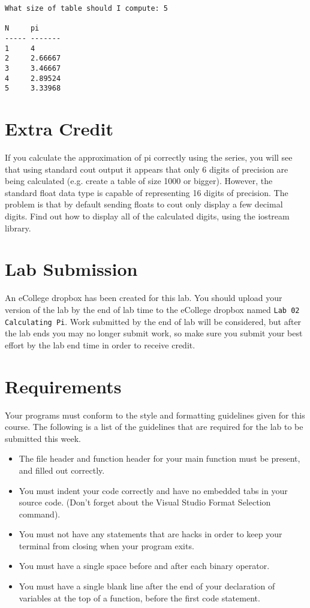 \documentclass[11pt]{article}
\begin{document}
\begin{verbatim}
What size of table should I compute: 5

N     pi
----- -------
1     4
2     2.66667
3     3.46667
4     2.89524
5     3.33968
\end{verbatim}
\section*{Extra Credit}
\label{sec-4}

If you calculate the approximation of pi correctly using the series,
you will see that using standard cout output it appears that only 6
digits of precision are being calculated (e.g. create a table of size
1000 or bigger).  However, the standard float data type is capable of
representing 16 digits of precision.  The problem is that by default
sending floats to cout only display a few decimal digits.  Find out
how to display all of the calculated digits, using the iostream
library.
\section*{Lab Submission}
\label{sec-5}


An eCollege dropbox has been created for this lab.  You should
upload your version of the lab by the end of lab time to the eCollege
dropbox named \verb~Lab 02 Calculating Pi~.  Work submitted by the end
of lab will be considered, but after the lab ends you may no longer
submit work, so make sure you submit your best effort by the lab end
time in order to receive credit.
\section*{Requirements}
\label{sec-6}

Your programs must conform to the style and formatting guidelines given for this course.
The following is a list of the guidelines that are required for the lab to be submitted
this week.

\begin{itemize}
\item The file header and function header for your main function must be present, and filled out correctly.
\item You must indent your code correctly and have no embedded tabs in your source code. (Don't forget about the Visual Studio Format Selection command).
\item You must not have any statements that are hacks in order to keep your terminal from closing when your program exits.
\item You must have a single space before and after each binary operator.
\item You must have a single blank line after the end of your declaration
  of variables at the top of a function, before the first code
  statement.
\end{itemize}
\end{document}
